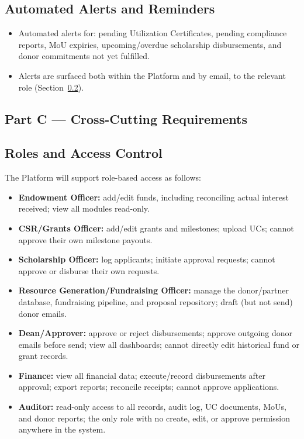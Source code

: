 \documentclass[11pt]{article}
\begin{document}
\subsection{Automated Alerts and Reminders}
\begin{itemize}[leftmargin=1.4em, itemsep=3pt]
\item Automated alerts for: pending Utilization Certificates, pending compliance reports, MoU expiries, upcoming/overdue scholarship disbursements, and donor commitments not yet fulfilled.
\item Alerts are surfaced both within the Platform and by email, to the relevant role (Section~\ref{sec:roles}).
\end{itemize}

\subsection*{Part C --- Cross-Cutting Requirements}

\subsection{Roles and Access Control}
\label{sec:roles}
The Platform will support role-based access as follows:
\begin{itemize}[leftmargin=1.4em, itemsep=3pt]
\item \textbf{Endowment Officer:} add/edit funds, including reconciling actual interest received; view all modules read-only.
\item \textbf{CSR/Grants Officer:} add/edit grants and milestones; upload UCs; cannot approve their own milestone payouts.
\item \textbf{Scholarship Officer:} log applicants; initiate approval requests; cannot approve or disburse their own requests.
\item \textbf{Resource Generation/Fundraising Officer:} manage the donor/partner database, fundraising pipeline, and proposal repository; draft (but not send) donor emails.
\item \textbf{Dean/Approver:} approve or reject disbursements; approve outgoing donor emails before send; view all dashboards; cannot directly edit historical fund or grant records.
\item \textbf{Finance:} view all financial data; execute/record disbursements after approval; export reports; reconcile receipts; cannot approve applications.
\item \textbf{Auditor:} read-only access to all records, audit log, UC documents, MoUs, and donor reports; the only role with no create, edit, or approve permission anywhere in the system.
\end{itemize}
\end{document}
